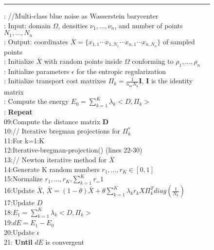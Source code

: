 \begin{figure}[htb]
\rule{0.5\textwidth}{0.4pt}
 : //Multi-class blue noise as Wasserstein barycenter\\
: Input: domain $\Omega$, densities $\nu_1,...,\nu_n$, and
  number of points $N_1,...,N_n$\\
: Output: coordinates $\bar X=\{x_{1,1} \cdots  x_{1,N_1} \cdots x_{n,1} \cdots x_{n,N_n}\}$  of sampled points\\
: Initialize $\bar X$ with random points inside $\Omega$ conforming to $\rho_1,...,\rho_n$ \\
: Initialize parameters $\epsilon$ for the entropic regularization\\
: Initialize transport cost matrixes $\Pi_k=\frac{1}{n_mN_k}\mathbf{I}$, $\mathbf{I}$ is the identity matrix\\
: Compute the energy $E_0=\sum_{k=1}^K\lambda_k<D,\Pi_k>$\\
: \textbf{Repeat}\\
09:\quad Compute the distance matrix $\mathbf{D}$ \\
10:\quad // Iterative bregman projections for $\Pi_k^*$\\
11:\quad For k=1:K \\
12:\quad \quad  Iterative-bregman-projection() (lines 22-30) \\
13:\quad // Newton iterative method for $\bar X$ \\
14:\quad Generate K random numbers $r_1,...,r_K\in[0,1]$\\
15:\quad Normalize $r_1,...,r_K$,$\sum_{k=1}^Kr_=1$\\
16:\quad Update $\bar X$, $\bar X=(1-\theta)\bar X+\theta\sum_{k=1}^K\lambda_kr_kX\Pi_k^Tdiag(\frac{1}{N_k})$\\
17:\quad Update $D$\\
18:\quad $E_1=\sum_{k=1}^K\lambda_k<D,\Pi_k>$ \\
19:\quad $dE=E_1-E_0$\\
20:\quad Update $\epsilon$ \\
21: \textbf{Until} $dE$ is convergent \\


\end{figure}
